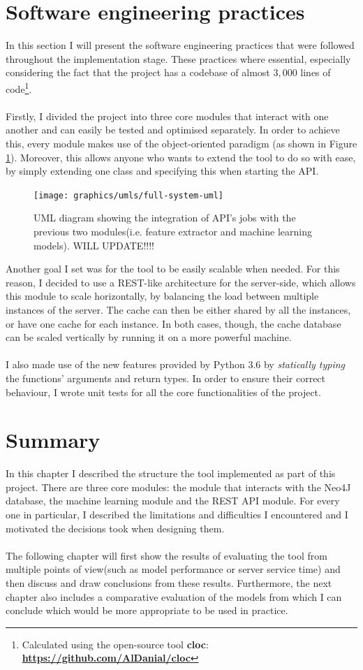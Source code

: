 	\section{Software engineering practices} \label{Section: impl/SoftEngPractices}
	In this section I will present the software engineering practices that were followed throughout the implementation stage. These practices where essential, especially considering the fact that the project has a codebase of almost $3,000$ lines of code\footnote{Calculated using the open-source tool \textbf{cloc}: \textbf{\url{https://github.com/AlDanial/cloc}}}. 
	\\ \\
	Firstly, I divided the project into three core modules that interact with one another and can easily be tested and optimised separately. In order to achieve this, every module makes use of the object-oriented paradigm (as shown in Figure \ref{Fig: impl/REST/API-integrate}). Moreover, this allows anyone who wants to extend the tool to do so with ease, by simply extending one class and specifying this when starting the API.  
	\begin{figure}[H]
		\centering
		\texttt{[image: graphics/umls/full-system-uml]}
		\caption[General UML diagram]{\centering UML diagram showing the integration of API's jobs with the previous two modules(i.e. feature extractor and machine learning models). WILL UPDATE!!!!}
		\label{Fig: impl/REST/API-integrate}
	\end{figure}
	Another goal I set was for the tool to be easily scalable when needed. For this reason, I decided to use a REST-like architecture for the server-side, which allows this module to scale horizontally, by balancing the load between multiple instances of the server. The cache can then be either shared by all the instances, or have one cache for each instance. In both cases, though, the cache database can be scaled vertically by running it on a more powerful machine. 
	\\ \\
	I also made use of the new features provided by Python $3.6$ by \textit{statically typing} the functions' arguments and return types. In order to ensure their correct behaviour, I wrote unit tests for all the core functionalities of the project.
	\section{Summary} \label{Section: impl/summary}
	In this chapter I described the structure the tool implemented as part of this project. There are three core modules: the module that interacts with the Neo4J database, the machine learning module and the REST API module. For every one in particular, I described the limitations and difficulties I encountered and I motivated the decisions took when designing them. 
	\\ \\
	The following chapter will first show the results of evaluating the tool from multiple points of view(such as model performance or server service time) and then discuss and draw conclusions from these results. Furthermore, the next chapter also includes a comparative evaluation of the models from which I can conclude which would be more appropriate to be used in practice. 
